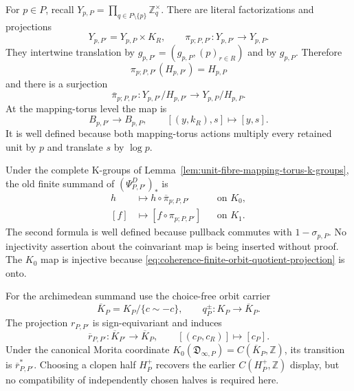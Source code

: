 For $p\in P$, recall
$Y_{p,P}=\prod_{q\in P\setminus\{p\}}\mathbb Z_q^\times$.  There are literal
factorizations and projections
\begin{equation}
 Y_{p,P'}=Y_{p,P}\times K_R,
 \qquad
 \pi_{p;P,P'}:Y_{p,P'}\longrightarrow Y_{p,P}.
 \label{eq:coherence-finite-boundary-unit-projection}
\end{equation}
They intertwine translation by
$g_{p,P'}=(g_{p,P},(p)_{r\in R})$ and by $g_{p,P}$.  Therefore
\begin{equation}
 \pi_{p;P,P'}(H_{p,P'})=H_{p,P}
 \label{eq:coherence-procyclic-closure-projection}
\end{equation}
and there is a surjection
\begin{equation}
 \overline\pi_{p;P,P'}:
 Y_{p,P'}/H_{p,P'}\longrightarrow Y_{p,P}/H_{p,P}.
 \label{eq:coherence-finite-orbit-quotient-projection}
\end{equation}
At the mapping-torus level the map is
\begin{equation}
 B_{p,P'}\longrightarrow B_{p,P},\qquad
 [(y,k_R),s]\longmapsto[y,s].
 \label{eq:coherence-finite-mapping-torus-projection}
\end{equation}
It is well defined because both mapping-torus actions multiply every retained
unit by $p$ and translate $s$ by $\log p$.

Under the complete K-groups of
Lemma~\ref{lem:unit-fibre-mapping-torus-k-groups}, the old finite summand of
$(\Psi^D_{P,P'})_*$ is
\begin{align}
 h&\longmapsto h\circ\overline\pi_{p;P,P'}
 &&\text{on }K_0,
 \label{eq:coherence-finite-K0-transition}\\
 [f]&\longmapsto[f\circ\pi_{p;P,P'}]
 &&\text{on }K_1.
 \label{eq:coherence-finite-K1-transition}
\end{align}
The second formula is well defined because pullback commutes with
$1-\sigma_{p,P}$.  No injectivity assertion about the coinvariant map is
being inserted without proof.  The $K_0$ map is injective because
\eqref{eq:coherence-finite-orbit-quotient-projection} is onto.

For the archimedean summand use the choice-free orbit carrier
\begin{equation}
 \overline K_P=K_P/\{c\sim-c\},\qquad
 q_P^\pm:K_P\longrightarrow\overline K_P.
 \label{eq:coherence-arch-orbit-carrier}
\end{equation}
The projection $r_{P,P'}$ is sign-equivariant and induces
\begin{equation}
 \overline r_{P,P'}:\overline K_{P'}\longrightarrow\overline K_P,
 \qquad[(c_P,c_R)]\longmapsto[c_P].
 \label{eq:coherence-arch-orbit-projection}
\end{equation}
Under the canonical Morita coordinate
$K_0(\mathfrak D_{\infty,P})=C(\overline K_P,\mathbb Z)$, its transition is
$\overline r_{P,P'}^*$.  Choosing a clopen half $H_P^+$ recovers the earlier
$C(H_P^+,\mathbb Z)$ display, but no compatibility of independently chosen
halves is required here.

